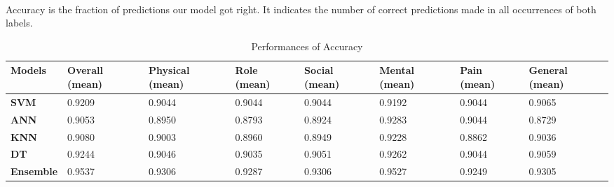 \documentclass[runningheads]{llncs}
\begin{document}
\paragraph{}
Accuracy is the fraction of predictions our model got right. It indicates the number of correct predictions made in all occurrences of both labels. 
\begin{table}[h]
\begin{tabular}{|C{2cm}|C{1.5cm}|C{1.5cm}|C{1.5cm}|C{1.5cm}|C{1.5cm}|C{1.5cm}|C{1.5cm}|}
\hline
{} 
{\color[HTML]{333333} \textbf{Models}} & {\color[HTML]{333333} \textbf{Overall (mean)}} & {\color[HTML]{333333} \textbf{Physical (mean)}} & {\color[HTML]{333333} \textbf{Role (mean)}} &{\color[HTML]{333333} \textbf{Social (mean)}} & {\color[HTML]{333333} \textbf{Mental (mean)}} & {\color[HTML]{333333} \textbf{Pain (mean)}} & {\color[HTML]{333333} \textbf{General (mean)}} \\ \hline
{} 
\textbf{SVM} & 0.9209  &0.9044 & 0.9044 & 0.9044 & 0.9192 & 0.9044  & 0.9065  \\ \hline
{} 
\textbf{ANN} & 0.9053 & 0.8950 & 0.8793 & 0.8924 & 0.9283 & 0.9044 & 0.8729 \\ \hline
{} 
\textbf{KNN} & 0.9080  & 0.9003 & 0.8960 & 0.8949 & 0.9228 & 0.8862 & 0.9036 \\ \hline
{} 
\textbf{DT} & 0.9244 & 0.9046 & 0.9035  & 0.9051 & 0.9262 & 0.9044 & 0.9059 \\ \hline
{} 
\textbf{Ensemble} & 0.9537 & 0.9306 & 0.9287  & 0.9306  & 0.9527 & 0.9249 & 0.9305  \\ \hline
\end{tabular}
\caption{Performances of Accuracy}
\label{Accuracy}
\end{table}
%
%
\end{document}

